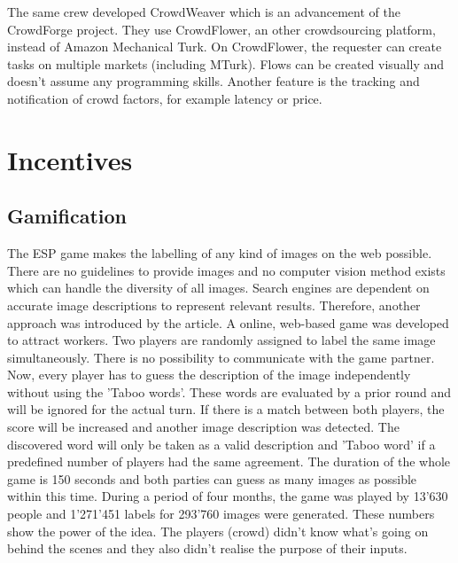 The same crew developed CrowdWeaver\cite{crowdweaver} which is an advancement of the CrowdForge project. They use CrowdFlower, an other crowdsourcing platform, instead of Amazon Mechanical Turk. On CrowdFlower, the requester can create tasks on multiple markets (including MTurk). Flows can be created visually and doesn't assume any programming skills. Another feature is the tracking and notification of crowd factors, for example latency or price.

\section{Incentives}

\subsection{Gamification}
The ESP game\cite{esp} makes the labelling of any kind of images on the web possible. There are no guidelines to provide images and no computer vision method exists which can handle the diversity of all images. Search engines are dependent on accurate image descriptions to represent relevant results. Therefore, another approach was introduced by the article. A online, web-based game was developed to attract workers. Two players are randomly assigned to label the same image simultaneously. There is no possibility to communicate with the game partner. Now, every player has to guess the description of the image independently without using the 'Taboo words'. These words are evaluated by a prior round and will be ignored for the actual turn. If there is a match between both players, the score will be increased and another image description was detected. The discovered word will only be taken as a valid description and 'Taboo word' if a predefined number of players had the same agreement. The duration of the whole game is 150 seconds and both parties can guess as many images as possible within this time. 
During a period of four months, the game was played by 13'630 people and 1'271'451 labels for 293'760 images were generated. These numbers show the power of the idea. The players (crowd) didn't know what's going on behind the scenes and they also didn't realise the purpose of their inputs.

